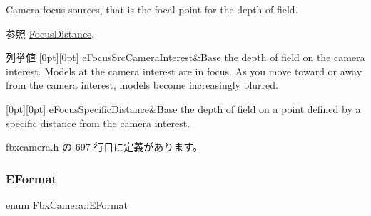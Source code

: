 Camera focus sources, that is the focal point for the depth of field. \begin{DoxySeeAlso}{参照}
\hyperlink{class_fbx_camera_af6165df26c7d25156163a3ed2a2f99c2}{Focus\+Distance}. 
\end{DoxySeeAlso}
\begin{DoxyEnumFields}{列挙値}
[0pt][0pt]{}\mbox{\label{class_fbx_camera_a1b50e7b2953019a40328599679071ad4a2063934bfeffc9520cda2fc76c07aac1}} 
e\+Focus\+Src\+Camera\+Interest&Base the depth of field on the camera interest. Models at the camera interest are in focus. As you move toward or away from the camera interest, models become increasingly blurred. \\
\hline

[0pt][0pt]{}\mbox{\label{class_fbx_camera_a1b50e7b2953019a40328599679071ad4a81da6b77be08c0270652f6a23db4d77b}} 
e\+Focus\+Specific\+Distance&Base the depth of field on a point defined by a specific distance from the camera interest. \\
\hline

\end{DoxyEnumFields}


 fbxcamera.\+h の 697 行目に定義があります。

\mbox{\label{class_fbx_camera_a88d68c983d21e4d6c0f281a8a30f0a06}} 
\subsubsection{\texorpdfstring{E\+Format}{EFormat}}
{\footnotesize\ttfamily enum \hyperlink{class_fbx_camera_a88d68c983d21e4d6c0f281a8a30f0a06}{Fbx\+Camera\+::\+E\+Format}}

